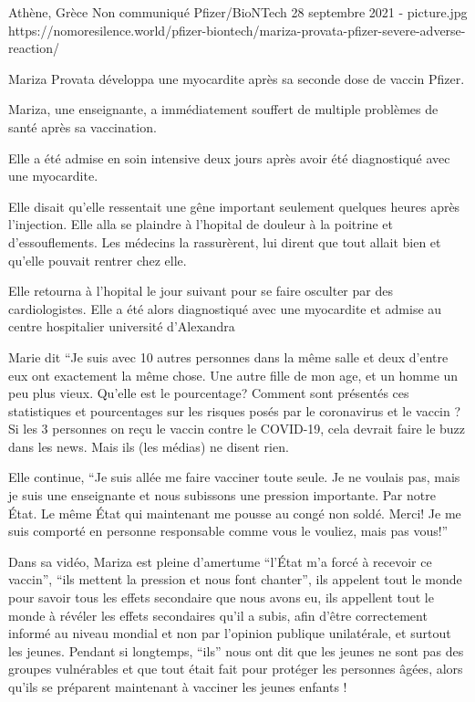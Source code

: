 {Athène, Grèce}
{Non communiqué}
{Pfizer/BioNTech}
{28 septembre 2021}
{-}
{picture.jpg}
{https://nomoresilence.world/pfizer-biontech/mariza-provata-pfizer-severe-adverse-reaction/}
{

Mariza Provata développa une myocardite après sa seconde dose de vaccin Pfizer.

Mariza, une enseignante, a immédiatement souffert de multiple problèmes de santé
après sa vaccination.

Elle a été admise en soin intensive deux jours après avoir été diagnostiqué avec une myocardite.

Elle disait qu'elle ressentait une gêne important seulement quelques heures
après l'injection. Elle alla se plaindre à l'hopital de douleur à la poitrine et
d'essouflements. Les médecins la rassurèrent, lui dirent que tout allait bien et
qu'elle pouvait rentrer chez elle.

Elle retourna à l'hopital le jour suivant pour se faire osculter par des
cardiologistes. Elle a été alors diagnostiqué avec une myocardite et admise au
centre hospitalier université d'Alexandra

Marie dit “Je suis avec 10 autres personnes dans la même salle et deux d'entre
eux ont exactement la même chose. Une autre fille de mon age, et un homme un peu
plus vieux. Qu'elle est le pourcentage? Comment sont présentés ces statistiques
et pourcentages sur les risques posés par le coronavirus et le vaccin ? Si les 3
personnes on reçu le vaccin contre le COVID-19, cela devrait faire le buzz dans
les news. Mais ils (les médias) ne disent rien.

Elle continue, “Je suis allée me faire vacciner toute seule. Je ne voulais pas,
mais je suis une enseignante et nous subissons une pression importante. Par
notre État. Le même État qui maintenant me pousse au congé non soldé. Merci! Je
me suis comporté en personne responsable comme vous le vouliez, mais pas vous!”

Dans sa vidéo, Mariza est pleine d'amertume “l'État m'a forcé à recevoir ce
vaccin”, “ils mettent la pression et nous font chanter”, ils appelent tout le
monde pour savoir tous les effets secondaire que nous avons eu, ils appellent
tout le monde à révéler les effets secondaires qu'il a subis, afin d'être
correctement informé au niveau mondial et non par l'opinion publique
unilatérale, et surtout les jeunes. Pendant si longtemps, “ils” nous ont dit que
les jeunes ne sont pas des groupes vulnérables et que tout était fait pour
protéger les personnes âgées, alors qu'ils se préparent maintenant à vacciner
les jeunes enfants !

}

